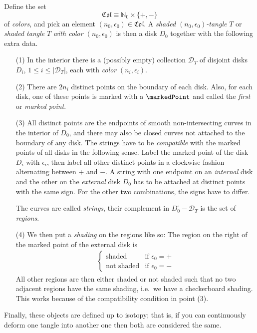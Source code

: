 \begin{definition}\label{def:shaded planar tangle}
Define the set \[\mathfrak{Col} \equiv \mathbb{N}_0\times \{+,-\}\] of \emph{colors}, and pick an element $(n_0,\epsilon_0)\in\mathfrak{Col}$. A \emph{shaded $(n_0, \epsilon_0)$-tangle} $T$ or \emph{shaded tangle} $T$ \emph{with color $(n_0, \epsilon_0)$} is then a disk $D_0$ together with the following extra data.
\begin{itemize}
\item[\textsf{(1)}] In the interior there is a (possibly empty) collection $\mathcal{D}_T$ of disjoint disks $D_i$, $1\leq i \leq \lvert \mathcal{D}_T \rvert$, each with \emph{color} $(n_i, \epsilon_i)$.
\item[\textsf{(2)}] There are $2n_i$ distinct points on the boundary of each disk. Also, for each disk, one of these points is marked with a $\markedPoint$ and called the \emph{first} or \emph{marked point}.
\item[\textsf{(3)}] All distinct points are the endpoints of smooth non-intersecting curves in the interior of $D_0$, and there may also be closed curves not attached to the boundary of any disk. The strings have to be \emph{compatible} with the marked points of all disks in the following sense. Label the marked point of the disk $D_i$ with $\epsilon_i$, then label all other distinct points in a clockwise fashion alternating between $+$ and $-$. A string with one endpoint on an \emph{internal} disk and the other on the \emph{external} disk $D_0$ has to be attached at distinct points with the same sign. For the other two combinations, the signs have to differ.

The curves are called \emph{strings}, their complement in $D_0^\circ - \mathcal{D}_T$ is the set of \emph{regions}. 
\item[\textsf{(4)}] We then put a \emph{shading} on the regions like so: The region on the right of the marked point of the external disk is 
\begin{align*}
	\begin{cases}
		\text{shaded} & \text{if } \epsilon_0 = +\\
		\text{not shaded} & \text{if } \epsilon_0= -
	\end{cases}
\end{align*}
All other regions are then either shaded or not shaded such that no two adjacent regions have the same shading, i.e.\ we have a checkerboard shading. This works because of the compatibility condition in point \textsf{(3)}.

\end{itemize}

Finally, these objects are defined up to isotopy; that is, if you can continuously deform one tangle into another one then both are considered the same.
\end{definition}

